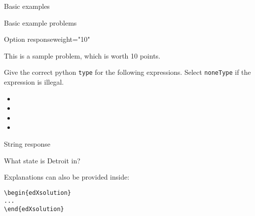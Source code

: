 
\begin{edXchapter}{Basic examples}


\begin{edXsequential}{Basic example problems}

\begin{edXvertical}

\begin{edXproblem}{Option response}{weight="10"}

This is a sample problem, which is worth 10 points.

Give the correct python \texttt{type} for the following expressions.  Select \texttt{noneType} if the expression is illegal.

\begin{itemize}
\item {}   
\item {} 
\item {} 
\item {} 
\end{itemize}


\end{edXproblem}


\begin{edXproblem}{String response}

What state is Detroit in?


\begin{edXsolution}

Explanations can also be provided inside:
\begin{verbatim}
\begin{edXsolution}
... 
\end{edXsolution}
\end{verbatim}


\end{edXsolution}
\end{edXproblem}
\end{edXvertical}
\end{edXsequential}
\end{edXchapter}
